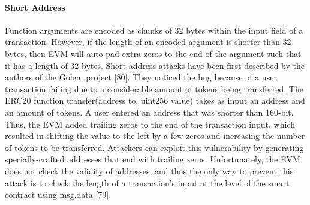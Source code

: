         \paragraph{Short Address}
            Function arguments are encoded as chunks of 32 bytes within the input field of a transaction.
            However, if the length of an encoded argument is shorter than 32 bytes, then EVM will auto-pad extra zeros to the end of the argument such that it has a length of 32 bytes.
            Short address attacks have been first described by the authors of the Golem project [80].
            They noticed the bug because of a user transaction failing due to a considerable amount of tokens being transferred. The ERC20 function transfer(address to, uint256 value) takes as input an address and an amount of tokens.
            A user entered an address that was shorter than 160-bit.
            Thus, the EVM added trailing zeros to the end of the transaction input, which resulted in shifting the value to the left by a few zeros and increasing the number of tokens to be transferred.
            Attackers can exploit this vulnerability by generating specially-crafted addresses that end with trailing zeros.
            Unfortunately, the EVM does not check the validity of addresses, and thus the only way to prevent this attack is to check the length of a transaction's input at the level of the smart contract using msg.data [79].